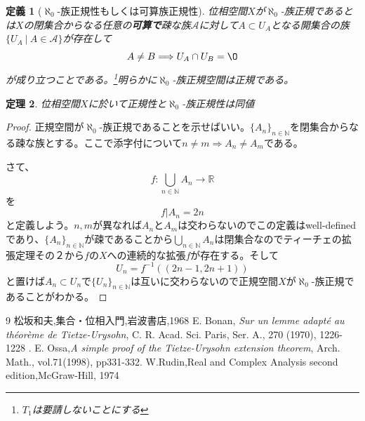 \documentclass[leqno]{jsarticle}
\newtheorem{thm}{定理}
\newtheorem{df}[thm]{定義}
\newcommand{\To}{\Longrightarrow}
\newcommand{\nn}{\mathbb{N}}
\newcommand{\rr}{\mathbb{R}}
\newcommand{\dpst}{\displaystyle}
\begin{document}
\begin{df}[$\aleph_0$-族正規性もしくは可算族正規性]
位相空間$X$が$\aleph_0$-族正規であるとは$X$の閉集合からなる任意の{\bf 可算で}疎な族$\mathcal{A}$に対して$A\subset U_A$となる開集合の族$\{U_{A}\ |\ A\in \mathcal{A}\}$が存在して
\[
A\neq B\To U_A\cap U_B=\O
\]
が成り立つことである。\footnote{$T_1$は要請しないことにする}明らかに$\aleph_0$-族正規空間は正規である。

\end{df}
\begin{thm}
位相空間$X$に於いて正規性と$\aleph_0$-族正規性は同値
\end{thm}
\begin{proof}
正規空間が$\aleph_0$-族正規であることを示せばいい。$\{A_n\}_{n\in \nn}$を閉集合からなる疎な族とする。ここで添字付について$n\ne m\To A_n\neq A_m$である。\par
さて、
\[
f:\bigcup_{n\in \nn}A_n\to \rr
\]
を
\[
f|A_n=2n
\]
と定義しよう。$n,m$が異なれば$A_n$と$A_m$は交わらないのでこの定義はwell-definedであり、$\{A_n\}_{n\in \nn}$が疎であることから$\dpst \bigcup_{n\in \nn}A_n$は閉集合なのでティーチェの拡張定理その２から$f$の$X$への連続的な拡張$f$が存在する。そして
\[
U_n=f^{-1}((2n-1,2n+1))
\]
と置けば$A_n\subset U_n$で$\{U_n\}_{n\in \nn}$は互いに交わらないので正規空間$X$が$\aleph_0$-族正規であることがわかる。
\end{proof}




















	
\begin{thebibliography}{9}
松坂和夫,集合・位相入門,岩波書店,1968
E. Bonan, \textit{Sur un lemme adapt\'e au th\'eor\`eme de Tietze-Urysohn}, C. R. Acad. Sci. Paris, Ser. A., 270 (1970), 1226-1228 .
 E. Ossa,{\it A simple proof of the Tietze-Urysohn extension theorem}, Arch. Math., vol.71(1998), pp331-332.
W.Rudin,Real and Complex Analysis second edition,McGraw-Hill, 1974
\end{thebibliography}




			
\end{document}
